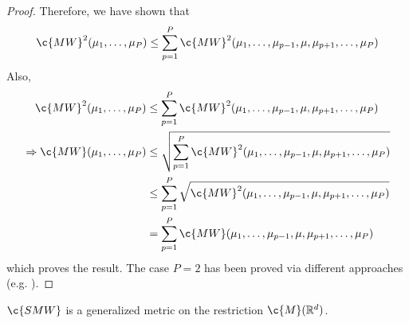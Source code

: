 \documentclass{article}
\newenvironment{customprop}[1]
{\renewcommand\theinnercustomprop{#1}\innercustomprop}
{\endinnercustomprop}
\begin{document}
\begin{proof}
Therefore, we have shown that
\begin{align}
    \c{MW}^2(\mu_1,\ldots,\mu_P) \leq \sum_{p=1}^P \c{MW}^2(\mu_1,\ldots,\mu_{p-1}, \mu, \mu_{p+1},\ldots,\mu_{P}) 
\end{align}
Also,
\begin{align}
    \quad \c{MW}^2(\mu_1,\ldots,\mu_P) & \leq \sum_{p=1}^P \c{MW}^2(\mu_1,\ldots,\mu_{p-1},\mu, \mu_{p+1},\ldots,\mu_{P})   
    \\
    \Rightarrow  \c{MW}(\mu_1,\ldots,\mu_P) & \leq \sqrt{\sum_{p=1}^P \c{MW}^2(\mu_1,\ldots,\mu_{p-1},\mu, \mu_{p+1},\ldots,\mu_{P}) }
    \\
    &\leq   \sum_{p=1}^P \sqrt{ \c{MW}^2(\mu_1,\ldots,\mu_{p-1},\mu, \mu_{p+1},\ldots,\mu_{P}) }
    \\
    &=\sum_{p=1}^P \c{MW}(\mu_1,\ldots,\mu_{p-1},\mu, \mu_{p+1},\ldots,\mu_{P}) 
\end{align}
which proves the result. The case $P=2$  has been proved via different approaches (e.g. \cite{compopt}).

\end{proof}

\begin{customprop}{\ref{prop:metricprop}}
$\c{SMW}$ is a generalized metric on the restriction $\c{M}(\mathbb{R}^d)$.
\end{customprop}
\end{document}
